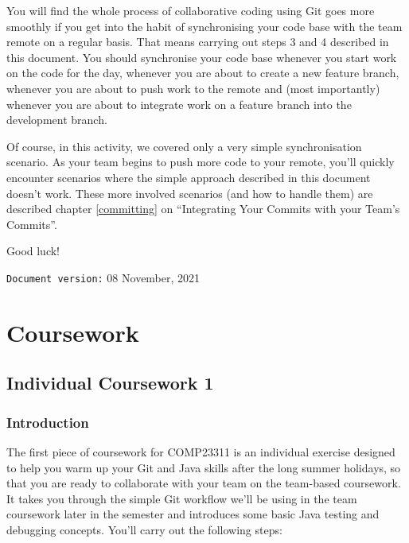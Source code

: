 \documentclass[
]{book}
\begin{document}
You will find the whole process of collaborative coding using Git goes more smoothly if you get into the habit of synchronising your code base with the team remote on a regular basis. That means carrying out steps 3 and 4 described in this document. You should synchronise your code base whenever you start work on the code for the day, whenever you are about to create a new feature branch, whenever you are about to push work to the remote and (most importantly) whenever you are about to integrate work on a feature branch into the development branch.

Of course, in this activity, we covered only a very simple synchronisation scenario. As your team begins to push more code to your remote, you'll quickly encounter scenarios where the simple approach described in this document doesn't work. These more involved scenarios (and how to handle them) are described chapter \ref{committing} on ``Integrating Your Commits with your Team's Commits''.

Good luck!

\texttt{Document\ version:} 08 November, 2021

\hypertarget{part-coursework}{%
\part{Coursework}\label{part-coursework}}

\hypertarget{gitting}{%
\chapter{Individual Coursework 1}\label{gitting}}

\hypertarget{introcw1}{%
\section{Introduction}\label{introcw1}}

The first piece of coursework for COMP23311 is an individual exercise designed to help you warm up your Git and Java skills after the long summer holidays, so that you are ready to collaborate with your team on the team-based coursework. It takes you through the simple Git workflow we'll be using in the team coursework later in the semester and introduces some basic Java testing and debugging concepts. You'll carry out the following steps:
\end{document}
